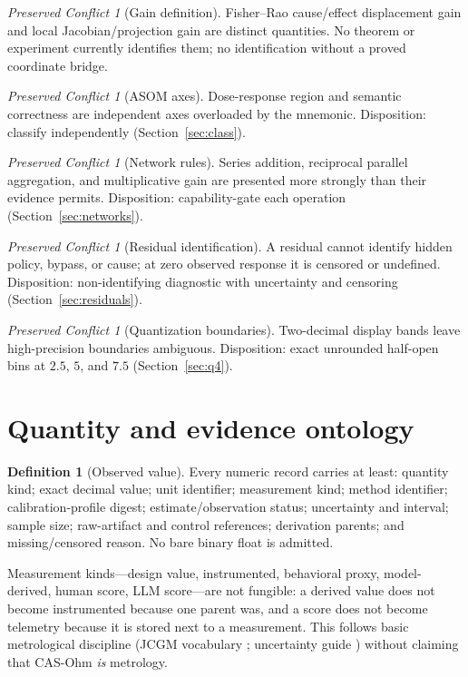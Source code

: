 \documentclass[11pt]{amsart}
\theoremstyle{definition}
\newtheorem{definition}[theorem]{Definition}
\theoremstyle{remark}
\newtheorem{conflict}[theorem]{Preserved Conflict}
\begin{document}
\begin{conflict}[Gain definition]
Fisher--Rao cause/effect displacement gain and local Jacobian/projection gain are distinct quantities. No theorem or experiment currently identifies them; no identification without a proved coordinate bridge.
\end{conflict}

\begin{conflict}[ASOM axes]
Dose-response region and semantic correctness are independent axes overloaded by the mnemonic. Disposition: classify independently (Section~\ref{sec:class}).
\end{conflict}

\begin{conflict}[Network rules]
Series addition, reciprocal parallel aggregation, and multiplicative gain are presented more strongly than their evidence permits. Disposition: capability-gate each operation (Section~\ref{sec:networks}).
\end{conflict}

\begin{conflict}[Residual identification]
A residual cannot identify hidden policy, bypass, or cause; at zero observed response it is censored or undefined. Disposition: non-identifying diagnostic with uncertainty and censoring (Section~\ref{sec:residuals}).
\end{conflict}

\begin{conflict}[Quantization boundaries]
Two-decimal display bands leave high-precision boundaries ambiguous. Disposition: exact unrounded half-open bins at $2.5$, $5$, and $7.5$ (Section~\ref{sec:q4}).
\end{conflict}

\section{Quantity and evidence ontology}

\begin{definition}[Observed value]
Every numeric record carries at least: quantity kind; exact decimal value; unit identifier; measurement kind; method identifier; calibration-profile digest; estimate/observation status; uncertainty and interval; sample size; raw-artifact and control references; derivation parents; and missing/censored reason. No bare binary float is admitted.
\end{definition}

Measurement kinds---design value, instrumented, behavioral proxy, model-derived, human score, LLM score---are not fungible: a derived value does not become instrumented because one parent was, and a score does not become telemetry because it is stored next to a measurement. This follows basic metrological discipline (JCGM vocabulary \cite{vim}; uncertainty guide \cite{gum}) without claiming that CAS-Ohm \emph{is} metrology.
\end{document}
